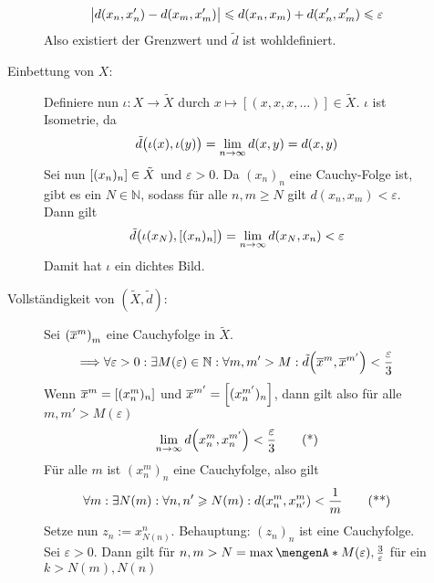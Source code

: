 \begin{description}
\begin{description}
	\[
		\abs[\big]{d(x_n,x_n') - d(x_m,x_m')} \le d(x_n, x_m) + d(x_n', x_m') \le \varepsilon
	\]
	Also existiert der Grenzwert und $\tilde{d}$ ist wohldefiniert.
	\item[Einbettung von $X$:] Definiere nun $\iota \colon X \to \tilde{X}$ durch $x \mapsto [(x,x,x, \ldots )] \in \tilde{X}$. $\iota$ ist Isometrie, da
	\[
		\tilde{d} \enbrace[\big]{\iota(x),\iota(y)} = \lim_{ n \to \infty} d(x,y) = d(x,y)
	\]
	Sei nun $\benbrace*{(x_n)_n} \in \tilde{X}$ und $\varepsilon>0$. Da $(x_n)_n$ eine Cauchy-Folge ist, gibt es ein $N \in \mathds{N}$, sodass für alle
	$n,m \ge N$ gilt $d(x_n,x_m) <\varepsilon$. Dann gilt
	\[
		\tilde{d}\enbrace[\big]{\iota(x_N), \benbrace*{(x_n)_n} } = \lim_{ n \to \infty} d \enbrace*{x_N, x_n} < \varepsilon
	\]
	Damit hat $\iota$ ein dichtes Bild.
	\item[Vollständigkeit von $(\tilde{X}, \tilde{d})$:] Sei $\enbrace*{\overline{x}^m}_m$ eine Cauchyfolge in $\tilde{X}$.
	\[
		\Longrightarrow \forall \varepsilon >0 : \exists M(\varepsilon) \in \mathds{N} : \forall m,m' > M : \tilde{d} \enbrace*{\overline{x}^m, \overline{x}^{m'}} < \frac{\varepsilon}{3} 
	\]
	Wenn $\overline{x}^m = \benbrace*{(x^m_n)_n}$ und $\overline{x}^{m'} = \benbrace*{(x^{m'}_n)_n} $, dann gilt also für alle $m,m' >M(\varepsilon)$
	\begin{equation*}
		\lim_{ n \to \infty} d \enbrace*{x^m_n, x^{m'}_n} < \frac{\varepsilon}{3}  \label{eq:15:absch1}\tag{*}
	\end{equation*}
	Für alle $m$ ist $(x^m_n)_n$ eine Cauchyfolge, also gilt
	\begin{equation*}
		\forall m : \exists N(m) : \forall n,n' \ge N(m) : d \enbrace*{x^m_n, x^m_{n'}} < \frac{1}{m}  \label{eq:15:absch2}\tag{**}
	\end{equation*}
	Setze nun $z_n := x^n_{N(n)}$. Behauptung: $(z_n)_n$ ist eine Cauchyfolge. Sei $\varepsilon>0$. Dann gilt für $n,m>N=\max\set{M(\varepsilon), \frac{3}{\varepsilon}}$
	für ein $k > N(m), N(n)$ 
	\begin{align*}

\end{align*}
\end{description}
\end{description}
